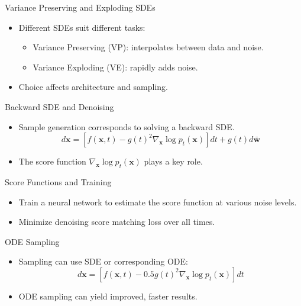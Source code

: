 \documentclass{beamer}
\newcommand{\bs}[1]{\boldsymbol{#1}}
\begin{document}
\begin{frame}{Variance Preserving and Exploding SDEs}
    \begin{itemize}
        \item Different SDEs suit different tasks:
        \begin{itemize}
            \item Variance Preserving (VP): interpolates between data and noise.
            \item Variance Exploding (VE): rapidly adds noise.
        \end{itemize}
        \item Choice affects architecture and sampling.
    \end{itemize}
\end{frame}

\begin{frame}{Backward SDE and Denoising}
    \begin{itemize}
        \item Sample generation corresponds to solving a backward SDE.
            \[
                d\bs{x} = [f(\bs{x}, t) - g(t)^2 \nabla_{\bs{x}} \log p_t(\bs{x})]dt + g(t)d\bar{\bs{w}}
            \]
        \item The score function \(\nabla_{\bs{x}} \log p_t(\bs{x})\) plays a key role.
    \end{itemize}
\end{frame}

\begin{frame}{Score Functions and Training}
    \begin{itemize}
        \item Train a neural network to estimate the score function at various noise levels.
        \item Minimize denoising score matching loss over all times.
    \end{itemize}
\end{frame}

\begin{frame}{ODE Sampling}
    \begin{itemize}
        \item Sampling can use SDE or corresponding ODE:
            \[
                d\bs{x} = [f(\bs{x}, t) - 0.5g(t)^2 \nabla_{\bs{x}}\log p_t(\bs{x})]dt
            \]
        \item ODE sampling can yield improved, faster results.
    \end{itemize}
\end{frame}
\end{document}
